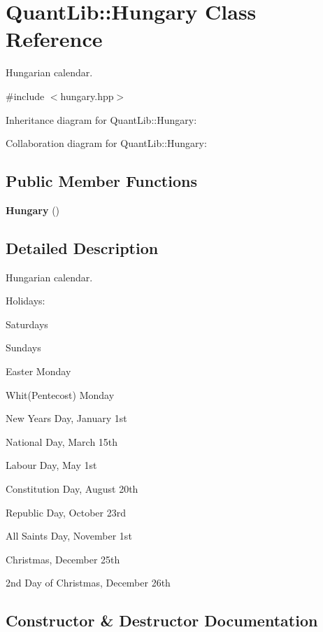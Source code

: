 \section{Quant\+Lib\+:\+:Hungary Class Reference}
\label{class_quant_lib_1_1_hungary}


Hungarian calendar.  




{\ttfamily \#include $<$hungary.\+hpp$>$}



Inheritance diagram for Quant\+Lib\+:\+:Hungary\+:


Collaboration diagram for Quant\+Lib\+:\+:Hungary\+:
\subsection*{Public Member Functions}
\begin{DoxyCompactItemize}
\item 
{\bf Hungary} ()
\end{DoxyCompactItemize}


\subsection{Detailed Description}
Hungarian calendar. 

Holidays\+: 
\begin{DoxyItemize}
\item Saturdays 
\item Sundays 
\item Easter Monday 
\item Whit(\+Pentecost) Monday  
\item New Year\textquotesingle{}s Day, January 1st 
\item National Day, March 15th 
\item Labour Day, May 1st 
\item Constitution Day, August 20th 
\item Republic Day, October 23rd 
\item All Saints Day, November 1st 
\item Christmas, December 25th 
\item 2nd Day of Christmas, December 26th 
\end{DoxyItemize}

\subsection{Constructor \& Destructor Documentation}
